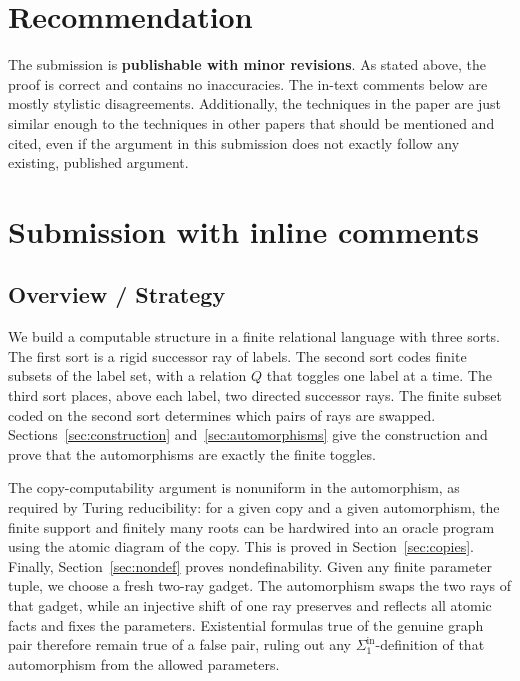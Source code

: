 \documentclass[12pt]{article}
\theoremstyle{definition}
\theoremstyle{remark}
\begin{document}
\section{Recommendation}

The submission is \textbf{publishable with minor revisions}. As stated above, the proof is correct and contains no inaccuracies. The in-text comments below are mostly stylistic disagreements. Additionally, the techniques in the paper are just similar enough to the techniques in other papers that should be mentioned and cited, even if the argument in this submission does not exactly follow any existing, published argument.

  \section{Submission with inline comments}


\date{}


\subsection*{Overview / Strategy}

We build a computable structure in a finite relational language with three sorts.  The first sort is a rigid successor ray of labels.  The second sort codes finite subsets of the label set, with a relation \(Q\) that toggles one label at a time.  The third sort places, above each label, two directed successor rays.  The finite subset coded on the second sort determines which pairs of rays are swapped.  Sections~\ref{sec:construction} and~\ref{sec:automorphisms} give the construction and prove that the automorphisms are exactly the finite toggles.

The copy-computability argument is nonuniform in the automorphism, as required by Turing reducibility: for a given copy and a given automorphism, the finite support and finitely many roots can be hardwired into an oracle program using the atomic diagram of the copy.  This is proved in Section~\ref{sec:copies}.  Finally, Section~\ref{sec:nondef} proves nondefinability.  Given any finite parameter tuple, we choose a fresh two-ray gadget.  The automorphism swaps the two rays of that gadget, while an injective shift of one ray preserves and reflects all atomic facts and fixes the parameters.  Existential formulas true of the genuine graph pair therefore remain true of a false pair, ruling out any \(\Sigma^{\mathrm{in}}_1\)-definition of that automorphism from the allowed parameters.
\end{document}
